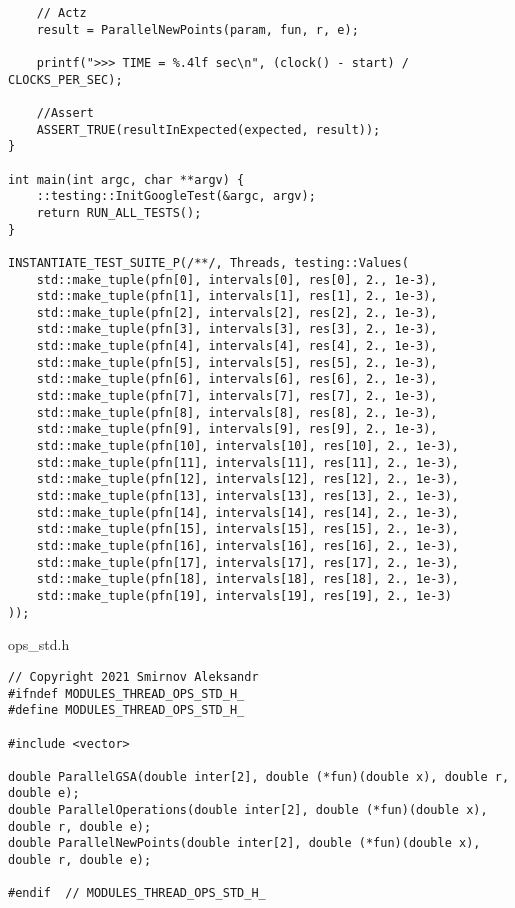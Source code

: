 \documentclass{report}
\begin{document}
\begin{lstlisting}
    // Actz
    result = ParallelNewPoints(param, fun, r, e);

    printf(">>> TIME = %.4lf sec\n", (clock() - start) / CLOCKS_PER_SEC);

    //Assert
    ASSERT_TRUE(resultInExpected(expected, result));
}

int main(int argc, char **argv) {
    ::testing::InitGoogleTest(&argc, argv);
    return RUN_ALL_TESTS();
}

INSTANTIATE_TEST_SUITE_P(/**/, Threads, testing::Values(
    std::make_tuple(pfn[0], intervals[0], res[0], 2., 1e-3),
    std::make_tuple(pfn[1], intervals[1], res[1], 2., 1e-3),
    std::make_tuple(pfn[2], intervals[2], res[2], 2., 1e-3),
    std::make_tuple(pfn[3], intervals[3], res[3], 2., 1e-3),
    std::make_tuple(pfn[4], intervals[4], res[4], 2., 1e-3),
    std::make_tuple(pfn[5], intervals[5], res[5], 2., 1e-3),
    std::make_tuple(pfn[6], intervals[6], res[6], 2., 1e-3),
    std::make_tuple(pfn[7], intervals[7], res[7], 2., 1e-3),
    std::make_tuple(pfn[8], intervals[8], res[8], 2., 1e-3),
    std::make_tuple(pfn[9], intervals[9], res[9], 2., 1e-3),
    std::make_tuple(pfn[10], intervals[10], res[10], 2., 1e-3),
    std::make_tuple(pfn[11], intervals[11], res[11], 2., 1e-3),
    std::make_tuple(pfn[12], intervals[12], res[12], 2., 1e-3),
    std::make_tuple(pfn[13], intervals[13], res[13], 2., 1e-3),
    std::make_tuple(pfn[14], intervals[14], res[14], 2., 1e-3),
    std::make_tuple(pfn[15], intervals[15], res[15], 2., 1e-3),
    std::make_tuple(pfn[16], intervals[16], res[16], 2., 1e-3),
    std::make_tuple(pfn[17], intervals[17], res[17], 2., 1e-3),
    std::make_tuple(pfn[18], intervals[18], res[18], 2., 1e-3),
    std::make_tuple(pfn[19], intervals[19], res[19], 2., 1e-3)
));
\end{lstlisting}

ops\_std.h
\begin{lstlisting}
// Copyright 2021 Smirnov Aleksandr
#ifndef MODULES_THREAD_OPS_STD_H_
#define MODULES_THREAD_OPS_STD_H_

#include <vector>

double ParallelGSA(double inter[2], double (*fun)(double x), double r, double e);
double ParallelOperations(double inter[2], double (*fun)(double x), double r, double e);
double ParallelNewPoints(double inter[2], double (*fun)(double x), double r, double e);

#endif  // MODULES_THREAD_OPS_STD_H_
\end{lstlisting}
\end{document}
